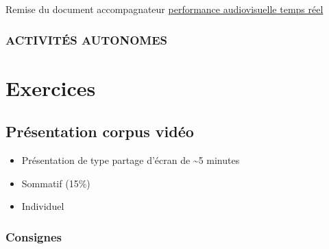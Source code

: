 \documentclass[
  french,
]{book}
\providecommand{\tightlist}{%
  \setlength{\itemsep}{0pt}\setlength{\parskip}{0pt}}
\begin{document}
Remise du document accompagnateur \protect\hyperlink{sommatif_5}{performance audiovisuelle temps réel}

\hypertarget{activituxe9s-autonomes-17}{%
\subsection{ACTIVITÉS AUTONOMES}\label{activituxe9s-autonomes-17}}

\hypertarget{exercices}{%
\chapter{Exercices}\label{exercices}}

\hypertarget{sommatif_1}{%
\section{Présentation corpus vidéo}\label{sommatif_1}}

\begin{itemize}
\tightlist
\item
  Présentation de type partage d'écran de \textasciitilde5 minutes
\item
  Sommatif (15\%)
\item
  Individuel
\end{itemize}

\hypertarget{consignes}{%
\subsection{Consignes}\label{consignes}}
\end{document}
